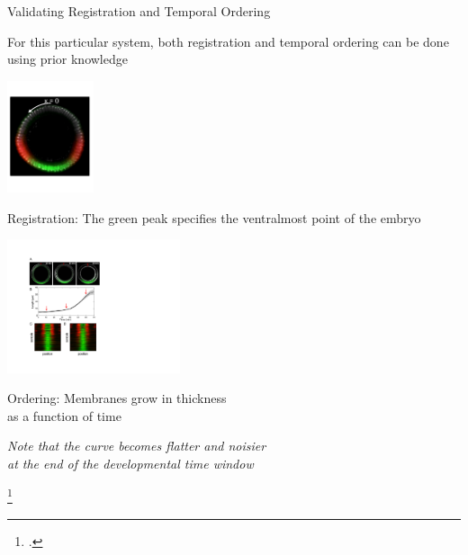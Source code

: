 \documentclass[10pt,aspectratio=169]{beamer}
\begin{document}
\begin{frame}{Validating Registration and Temporal Ordering}

\centering

For this particular system, both registration and temporal ordering can be done using prior  knowledge 

\vspace{0.1in}

\begin{minipage}{0.35\textwidth}
\begin{center}
\includegraphics[width=1in]{one_embryo}

{\small 
\textcolor{bold}{Registration:} The green peak specifies the ventralmost point of the embryo

\par}

\end{center}
\end{minipage}
\hfill
\begin{minipage}{0.6\textwidth}

\begin{center}
\includegraphics[width=2in, trim=0in 2.2in 0in 0in, clip]{fig6}

{\small 
\textcolor{bold}{Ordering:} 
Membranes grow in thickness \\as a function of time \footnotemark \par}

{\em \scriptsize Note that the curve becomes flatter and noisier \\at the end of the developmental time window \par}

\end{center}
\end{minipage}

\footcitetext{figard2013plasma}

\end{frame}
\end{document}
